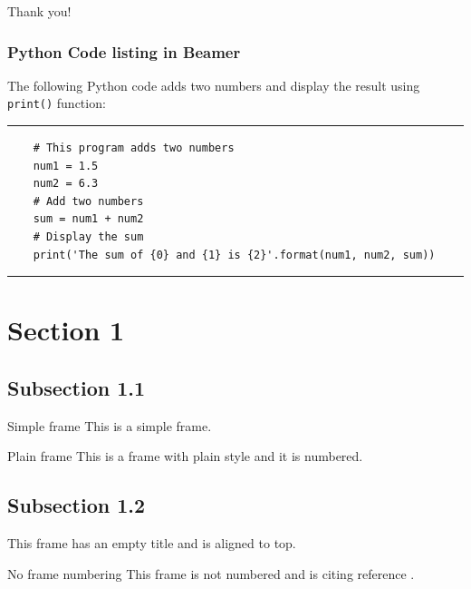 
\begin{frame}
Thank you!
\end{frame}

\begin{frame}[fragile]
\frametitle{Python Code listing in Beamer}
The following Python code adds two numbers and display the result using \verb|print()| function:
\rule{\textwidth}{1pt}
\scriptsize
\begin{verbatim}
    # This program adds two numbers
    num1 = 1.5
    num2 = 6.3
    # Add two numbers
    sum = num1 + num2
    # Display the sum
    print('The sum of {0} and {1} is {2}'.format(num1, num2, sum))
\end{verbatim}
\rule{\textwidth}{1pt}
\end{frame}


    \section{Section 1}
    \subsection{Subsection 1.1}
    \begin{frame}{Simple frame}
        This is a simple frame.
    \end{frame}

    \begin{frame}[plain]{Plain frame}
        This is a frame with plain style and it is numbered.
    \end{frame}
    
    \subsection{Subsection 1.2}
    \begin{frame}[t]
        This frame has an empty title and is aligned to top.
    \end{frame}
    
    \begin{frame}[noframenumbering]{No frame numbering}
        This frame is not numbered and is citing reference \cite{knuth74}.
    \end{frame}
    
